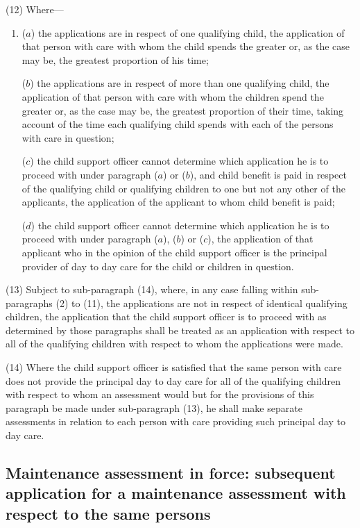 \documentclass[a4paper]{article}
\begin{document}
(12) Where—
\begin{enumerate}\item[]
($a$) the applications are in respect of one qualifying child, the application of that person with care with whom the child spends the greater or, as the case may be, the greatest proportion of his time;

($b$) the applications are in respect of more than one qualifying child, the application of that person with care with whom the children spend the greater or, as the case may be, the greatest proportion of their time, taking account of the time each qualifying child spends with each of the persons with care in question;

($c$) the child support officer cannot determine which application he is to proceed with under paragraph ($a$) or ($b$), and child benefit is paid in respect of the qualifying child or qualifying children to one but not any other of the applicants, the application of the applicant to whom child benefit is paid;

($d$) the child support officer cannot determine which application he is to proceed with under paragraph ($a$), ($b$) or ($c$), the application of that applicant who in the opinion of the child support officer is the principal provider of day to day care for the child or children in question.
\end{enumerate}

(13) Subject to sub-paragraph (14), where, in any case falling within sub-paragraphs (2) to (11), the applications are not in respect of identical qualifying children, the application that the child support officer is to proceed with as determined by those paragraphs shall be treated as an application with respect to all of the qualifying children with respect to whom the applications were made.

(14) Where the child support officer is satisfied that the same person with care does not provide the principal day to day care for all of the qualifying children with respect to whom an assessment would but for the provisions of this paragraph be made under sub-paragraph (13), he shall make separate assessments in relation to each person with care providing such principal day to day care.

\subsection*{Maintenance assessment in force: subsequent application for a maintenance assessment with respect to the same persons}
\end{document}
